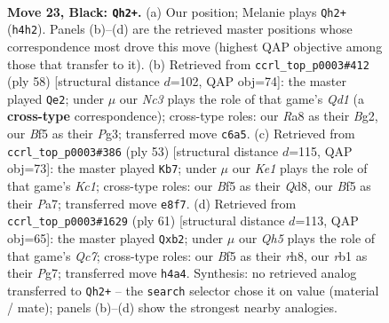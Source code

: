\documentclass[11pt]{article}
\begin{document}
\clearpage

\begin{figure}[p]\centering
\begin{subfigure}{0.46\textwidth}\centering
\resizebox{\linewidth}{!}{%
\newchessgame
\chessboard[
  setfen={r3k3/pp6/2n3p1/4bbP1/7q/3BQ3/3B2K1/1R4N1 b q - 0 23},
  showmover=false,
  pgfstyle=straightmove, color=movearrow, markmove={h4-h2}
]}
\caption{}
\end{subfigure}\hfill
\begin{subfigure}{0.46\textwidth}\centering
\resizebox{\linewidth}{!}{%
\newchessgame
\chessboard[
  setfen={2r2bk1/p6p/3P2p1/6N1/2nq4/6PP/P2B2B1/3Q3K w - - 1 30},
  showmover=false,
  pgfstyle=straightmove, color=movearrow, markmove={d1-e2}
]}
\caption{}
\end{subfigure}
\\[4pt]
\begin{subfigure}{0.46\textwidth}\centering
\resizebox{\linewidth}{!}{%
\newchessgame
\chessboard[
  setfen={2kq4/p3bp1p/4r1p1/2B5/1P6/3Q4/P2K1P1P/2R5 b - - 0 27},
  showmover=false,
  pgfstyle=straightmove, color=movearrow, markmove={c8-b7}
]}
\caption{}
\end{subfigure}\hfill
\begin{subfigure}{0.46\textwidth}\centering
\resizebox{\linewidth}{!}{%
\newchessgame
\chessboard[
  setfen={4kb1R/5pp1/p3n3/3b2P1/1p6/4Q3/PPq5/2N1KB2 b - - 6 31},
  showmover=false,
  pgfstyle=straightmove, color=movearrow, markmove={c2-b2}
]}
\caption{}
\end{subfigure}
\caption{\textbf{Move 23, Black: \texttt{Qh2+}.} (a) Our position; Melanie plays \texttt{Qh2+} (\texttt{h4h2}). Panels (b)--(d) are the retrieved master positions whose correspondence most drove this move (highest QAP objective among those that transfer to it). (b) Retrieved from \texttt{ccrl\_top\_p0003\#412} (ply 58) [structural distance $d$=102, QAP obj=74]: the master played \texttt{Qe2}; under $\mu$ our \emph{Nc3} plays the role of that game's \emph{Qd1} (a \textbf{cross-type} correspondence); cross-type roles: our \emph{R}a8 as their \emph{B}g2, our \emph{B}f5 as their \emph{P}g3; transferred move \texttt{c6a5}. (c) Retrieved from \texttt{ccrl\_top\_p0003\#386} (ply 53) [structural distance $d$=115, QAP obj=73]: the master played \texttt{Kb7}; under $\mu$ our \emph{Ke1} plays the role of that game's \emph{Kc1}; cross-type roles: our \emph{B}f5 as their \emph{Q}d8, our \emph{B}f5 as their \emph{P}a7; transferred move \texttt{e8f7}. (d) Retrieved from \texttt{ccrl\_top\_p0003\#1629} (ply 61) [structural distance $d$=113, QAP obj=65]: the master played \texttt{Qxb2}; under $\mu$ our \emph{Qh5} plays the role of that game's \emph{Qc7}; cross-type roles: our \emph{B}f5 as their \emph{r}h8, our \emph{r}b1 as their \emph{P}g7; transferred move \texttt{h4a4}. Synthesis: no retrieved analog transferred to \texttt{Qh2+} -- the \texttt{search} selector chose it on value (material / mate); panels (b)--(d) show the strongest nearby analogies.}
\label{fig:thought-m45}
\end{figure}
\end{document}
